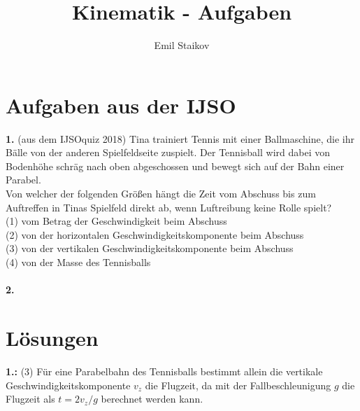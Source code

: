 \documentclass[11pt]{article}
\title{Kinematik - Aufgaben}
\author{Emil Staikov}
\date{}
\begin{document}
\maketitle
\section{Aufgaben aus der IJSO}
\textbf{1.} (aus dem IJSOquiz 2018)
Tina trainiert Tennis mit einer Ballmaschine, die ihr Bälle von der anderen Spielfeldseite zuspielt. Der Tennisball wird dabei von Bodenhöhe schräg nach oben abgeschossen und bewegt sich auf der Bahn einer Parabel. \\
Von welcher der folgenden Größen hängt die Zeit vom Abschuss bis zum Auftreffen in Tinas Spielfeld direkt ab, wenn Luftreibung keine Rolle spielt? \\

(1) vom Betrag der Geschwindigkeit beim Abschuss \\

(2) von der horizontalen Geschwindigkeitskomponente beim Abschuss \\

(3) von der vertikalen Geschwindigkeitskomponente beim Abschuss \\

(4) von der Masse des Tennisballs \\\\
\textbf{2.} 


\pagebreak

\section{Lösungen}
\textbf{1.:} (3) Für eine Parabelbahn des Tennisballs bestimmt allein die vertikale Geschwindigkeitskomponente $v_z$ die
Flugzeit, da mit der Fallbeschleunigung $g$ die Flugzeit als $t = 2v_z /g$ berechnet werden kann.
\end{document}

